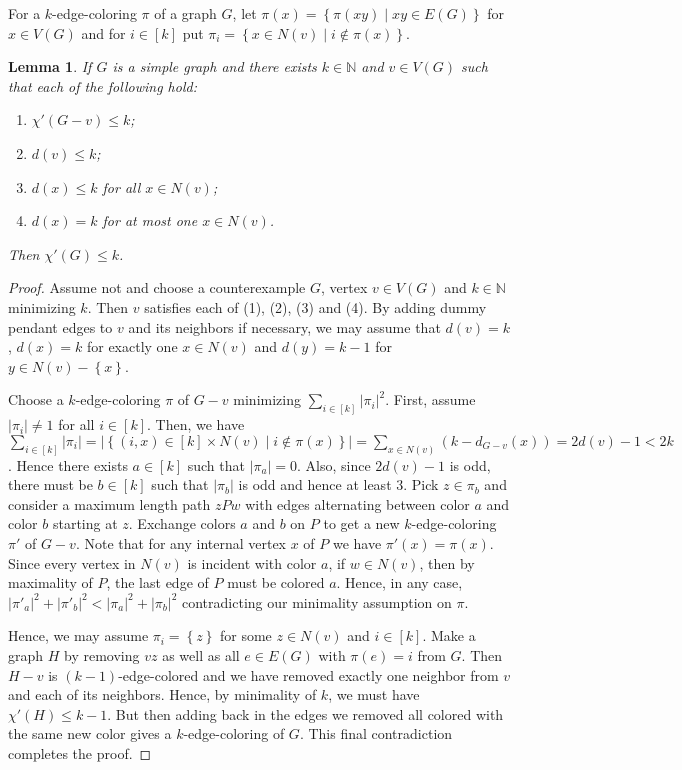\documentclass[12pt]{article}
\theoremstyle{plain}
\newtheorem{lem}[thm]{Lemma}
\theoremstyle{definition}
\theoremstyle{remark}
\newcommand{\set}[1]{\left\{ #1 \right\}}
\newcommand{\setb}[3]{\left\{ #1 \in #2 \mid #3 \right\}}
\newcommand{\setbs}[2]{\left\{ #1 \mid #2 \right\}}
\newcommand{\card}[1]{\left|#1\right|}
\newcommand{\irange}[1]{\left[#1\right]}
\begin{document}
For a $k$-edge-coloring $\pi$ of a graph $G$, let $\pi(x) = \setbs{\pi(xy)}{xy \in E(G)}$ for $x \in V(G)$ and for $i \in \irange{k}$ put $\pi_i = \setb{x}{N(v)}{i \not \in \pi(x)}$.

\begin{lem}\label{SimpleVizPrecursor}
If $G$ is a simple graph and there exists $k \in \mathbb{N}$ and $v \in V(G)$ such that each of the following hold:
\begin{enumerate}
\item $\chi'(G - v) \leq k$;
\item $d(v) \leq k$;
\item $d(x) \leq k$ for all $x \in N(v)$;
\item $d(x) = k$ for at most one $x \in N(v)$.
\end{enumerate}
Then $\chi'(G) \leq k$.
\end{lem}
\begin{proof}
Assume not and choose a counterexample $G$, vertex $v \in V(G)$ and $k \in \mathbb{N}$ minimizing $k$.  Then $v$ satisfies each of (1), (2), (3) and (4).  By adding dummy pendant edges to $v$ and its neighbors if necessary, we may assume that $d(v) = k$, $d(x) = k$ for exactly one $x \in N(v)$ and $d(y) = k - 1$ for $y \in N(v) - \set{x}$.

Choose a $k$-edge-coloring $\pi$ of $G - v$ minimizing $\sum_{i \in \irange{k}} \card{\pi_i}^2$.  First, assume $\card{\pi_i} \neq 1$ for all $i \in \irange{k}$.  Then, we have $\sum_{i \in \irange{k}} \card{\pi_i} = \card{\setb{(i, x)}{ \irange{k} \times N(v)}{i \not \in \pi(x)}} = \sum_{x \in N(v)} \left(k - d_{G-v}(x)\right) = 2d(v) - 1 < 2k$.  Hence there exists $a \in \irange{k}$ such that $\card{\pi_a} = 0$.  Also, since $2d(v) - 1$ is odd, there must be $b \in \irange{k}$ such that $\card{\pi_b}$ is odd and hence at least $3$.  Pick $z \in \pi_b$ and consider a maximum length path $zPw$ with edges alternating between color $a$ and color $b$ starting at $z$.  Exchange colors $a$ and $b$ on $P$ to get a new $k$-edge-coloring $\pi'$ of $G-v$.  Note that for any internal vertex $x$ of $P$ we have $\pi'(x) = \pi(x)$.  Since every vertex in $N(v)$ is incident with color $a$, if $w \in N(v)$, then by maximality of $P$, the last edge of $P$ must be colored $a$.  Hence, in any case, $\card{\pi'_a}^2 + \card{\pi'_b}^2 < \card{\pi_a}^2 + \card{\pi_b}^2$ contradicting our minimality assumption on $\pi$.

Hence, we may assume $\pi_i = \set{z}$ for some $z \in N(v)$ and $i \in \irange{k}$.  Make a graph $H$ by removing $vz$ as well as all $e \in E(G)$ with $\pi(e) = i$ from $G$.  Then $H-v$ is $(k-1)$-edge-colored and we have removed exactly one neighbor from $v$ and each of its neighbors.  Hence, by minimality of $k$, we must have $\chi'(H) \leq k - 1$.  But then adding back in the edges we removed all colored with the same new color gives a $k$-edge-coloring of $G$. This final contradiction completes the proof.
\end{proof}
\end{document}
